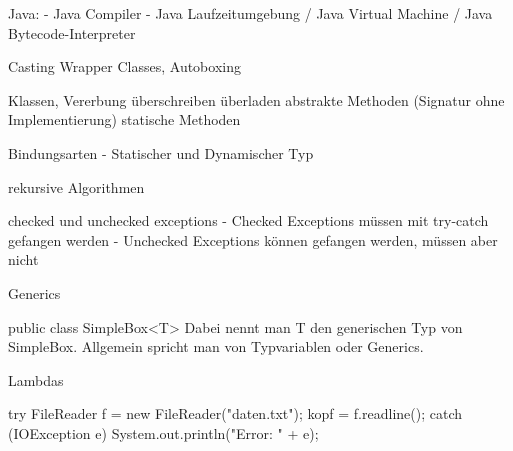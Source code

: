 Java:
 - Java Compiler
 - Java Laufzeitumgebung / Java Virtual Machine / Java Bytecode-Interpreter

Casting
Wrapper Classes, Autoboxing

Klassen, Vererbung
    überschreiben
    überladen
    abstrakte Methoden (Signatur ohne Implementierung)
    statische Methoden

\begin{defi}{}

\end{defi}


Bindungsarten
 - Statischer und Dynamischer Typ

rekursive Algorithmen

checked und unchecked exceptions
  - Checked Exceptions müssen mit try-catch gefangen werden
  - Unchecked Exceptions können gefangen werden, müssen aber nicht

Generics

    public class SimpleBox<T>
Dabei nennt man T den generischen Typ von SimpleBox. Allgemein spricht man von Typvariablen oder Generics.


Lambdas

try {
    FileReader f = new FileReader("daten.txt");
    kopf =  f.readline();
} catch (IOException e) {
    System.out.println("Error: " + e);
}





